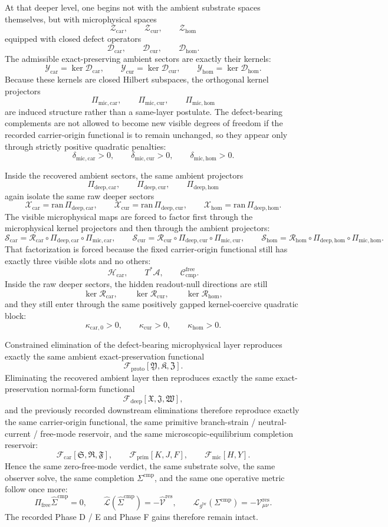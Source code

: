 \documentclass[11pt]{article}
\newcommand{\Sub}{\mathcal A}
\newcommand{\ObserverMetric}{g^{\mathrm{br}}}
\newcommand{\CompShift}{\Sigma^{\mathrm{cmp}}}
\newcommand{\CompLift}{\widehat\Sigma^{\mathrm{cmp}}}
\newcommand{\ResidualCore}{\mathcal V_{\mu\nu}^{\mathrm{res}}}
\newcommand{\ResidualLift}{\widehat{\mathcal V}^{\mathrm{res}}}
\newcommand{\SubReducedEin}{\widehat{\mathcal L}}
\newcommand{\FreeProj}{\Pi_{\mathrm{free}}}
\newcommand{\GaugeAux}{Y}
\newcommand{\ReducedEin}{\mathcal L_{\ObserverMetric}}
\newcommand{\CompFree}{\mathscr C_{\mathrm{cmp}}^{\mathrm{free}}}
\newcommand{\MicFunctional}{\mathscr F_{\mathrm{mic}}}
\newcommand{\PrimFunctional}{\mathscr F_{\mathrm{prim}}}
\newcommand{\CarrierFunctional}{\mathscr F_{\mathrm{car}}}
\newcommand{\DeepFunctional}{\mathscr F_{\mathrm{deep}}}
\newcommand{\ProtoFunctional}{\mathscr F_{\mathrm{proto}}}
\newcommand{\PrimStrain}{K}
\newcommand{\PrimNeutral}{J}
\newcommand{\PrimFree}{F}
\newcommand{\CarrierClass}{\mathscr H_{\mathrm{car}}}
\newcommand{\CarrierSeed}{\mathfrak S}
\newcommand{\RelabelSeed}{\mathfrak R}
\newcommand{\FreeSeed}{\mathfrak F}
\newcommand{\PreCarGap}{\kappa_{\mathrm{car},0}}
\newcommand{\CurrentGap}{\kappa_{\mathrm{cur}}}
\newcommand{\HomGap}{\kappa_{\mathrm{hom}}}
\newcommand{\DeepTensorClass}{\mathscr X_{\mathrm{car}}}
\newcommand{\DeepRelabelClass}{\mathscr X_{\mathrm{cur}}}
\newcommand{\DeepFreeClass}{\mathscr X_{\mathrm{hom}}}
\newcommand{\DeepTensor}{\mathfrak X}
\newcommand{\DeepRelabel}{\mathfrak J}
\newcommand{\DeepFree}{\mathfrak W}
\newcommand{\CarRead}{\mathcal R_{\mathrm{car}}}
\newcommand{\CurRead}{\mathcal R_{\mathrm{cur}}}
\newcommand{\HomRead}{\mathcal R_{\mathrm{hom}}}
\newcommand{\ProtoTensorClass}{\mathscr Y_{\mathrm{car}}}
\newcommand{\ProtoRelabelClass}{\mathscr Y_{\mathrm{cur}}}
\newcommand{\ProtoFreeClass}{\mathscr Y_{\mathrm{hom}}}
\newcommand{\ProtoTensor}{\mathfrak Y}
\newcommand{\ProtoRelabel}{\mathfrak K}
\newcommand{\ProtoFree}{\mathfrak Z}
\newcommand{\ProtoCarProj}{\Pi_{\mathrm{deep,car}}}
\newcommand{\ProtoCurProj}{\Pi_{\mathrm{deep,cur}}}
\newcommand{\ProtoHomProj}{\Pi_{\mathrm{deep,hom}}}
\newcommand{\UltraTensorClass}{\mathscr Z_{\mathrm{car}}}
\newcommand{\UltraRelabelClass}{\mathscr Z_{\mathrm{cur}}}
\newcommand{\UltraFreeClass}{\mathscr Z_{\mathrm{hom}}}
\newcommand{\UltraCarProj}{\Pi_{\mathrm{mic,car}}}
\newcommand{\UltraCurProj}{\Pi_{\mathrm{mic,cur}}}
\newcommand{\UltraHomProj}{\Pi_{\mathrm{mic,hom}}}
\newcommand{\UltraCarGap}{\delta_{\mathrm{mic,car}}}
\newcommand{\UltraCurGap}{\delta_{\mathrm{mic,cur}}}
\newcommand{\UltraHomGap}{\delta_{\mathrm{mic,hom}}}
\newcommand{\TensorDefect}{\mathcal D_{\mathrm{car}}}
\newcommand{\CurDefect}{\mathcal D_{\mathrm{cur}}}
\newcommand{\HomDefect}{\mathcal D_{\mathrm{hom}}}
\newcommand{\UltraCarRead}{\mathcal S_{\mathrm{car}}}
\newcommand{\UltraCurRead}{\mathcal S_{\mathrm{cur}}}
\newcommand{\UltraHomRead}{\mathcal S_{\mathrm{hom}}}
\begin{document}
At that deeper level, one begins not with the ambient substrate spaces themselves, but with microphysical spaces
\[
\UltraTensorClass,\qquad
\UltraRelabelClass,\qquad
\UltraFreeClass
\]
equipped with closed defect operators
\[
\TensorDefect,\qquad
\CurDefect,\qquad
\HomDefect.
\]
The admissible exact-preserving ambient sectors are exactly their kernels:
\[
\ProtoTensorClass=\ker\TensorDefect,
\qquad
\ProtoRelabelClass=\ker\CurDefect,
\qquad
\ProtoFreeClass=\ker\HomDefect.
\]
Because these kernels are closed Hilbert subspaces, the orthogonal kernel projectors
\[
\UltraCarProj,\qquad
\UltraCurProj,\qquad
\UltraHomProj
\]
are induced structure rather than a same-layer postulate. The defect-bearing complements are not allowed to become new visible degrees of freedom if the recorded carrier-origin functional is to remain unchanged, so they appear only through strictly positive quadratic penalties:
\[
\UltraCarGap>0,\qquad
\UltraCurGap>0,\qquad
\UltraHomGap>0.
\]

Inside the recovered ambient sectors, the same ambient projectors
\[
\ProtoCarProj,\qquad
\ProtoCurProj,\qquad
\ProtoHomProj
\]
again isolate the same raw deeper sectors
\[
\DeepTensorClass=\mathrm{ran}\,\ProtoCarProj,
\qquad
\DeepRelabelClass=\mathrm{ran}\,\ProtoCurProj,
\qquad
\DeepFreeClass=\mathrm{ran}\,\ProtoHomProj.
\]
The visible microphysical maps are forced to factor first through the microphysical kernel projectors and then through the ambient projectors:
\[
\UltraCarRead=\CarRead\circ\ProtoCarProj\circ\UltraCarProj,
\qquad
\UltraCurRead=\CurRead\circ\ProtoCurProj\circ\UltraCurProj,
\qquad
\UltraHomRead=\HomRead\circ\ProtoHomProj\circ\UltraHomProj.
\]
That factorization is forced because the fixed carrier-origin functional still has exactly three visible slots and no others:
\[
\CarrierClass,\qquad
T^*\Sub,\qquad
\CompFree.
\]
Inside the raw deeper sectors, the hidden readout-null directions are still
\[
\ker\CarRead,\qquad
\ker\CurRead,\qquad
\ker\HomRead,
\]
and they still enter through the same positively gapped kernel-coercive quadratic block:
\[
\PreCarGap>0,\qquad
\CurrentGap>0,\qquad
\HomGap>0.
\]

Constrained elimination of the defect-bearing microphysical layer reproduces exactly the same ambient exact-preservation functional
\[
\ProtoFunctional[\ProtoTensor,\ProtoRelabel,\ProtoFree].
\]
Eliminating the recovered ambient layer then reproduces exactly the same exact-preservation normal-form functional
\[
\DeepFunctional[\DeepTensor,\DeepRelabel,\DeepFree],
\]
and the previously recorded downstream eliminations therefore reproduce exactly the same carrier-origin functional, the same primitive branch-strain / neutral-current / free-mode reservoir, and the same microscopic-equilibrium completion reservoir:
\[
\CarrierFunctional[\CarrierSeed,\RelabelSeed,\FreeSeed],
\qquad
\PrimFunctional[\PrimStrain,\PrimNeutral,\PrimFree],
\qquad
\MicFunctional[H,\GaugeAux].
\]
Hence the same zero-free-mode verdict, the same substrate solve, the same observer solve, the same completion \(\Sigma^{\mathrm{cmp}}\), and the same one operative metric follow once more:
\[
\FreeProj\CompLift=0,
\qquad
\SubReducedEin(\CompLift)=-\ResidualLift,
\qquad
\ReducedEin(\CompShift)=-\ResidualCore.
\]
The recorded Phase D / E and Phase F gains therefore remain intact.
\end{document}
